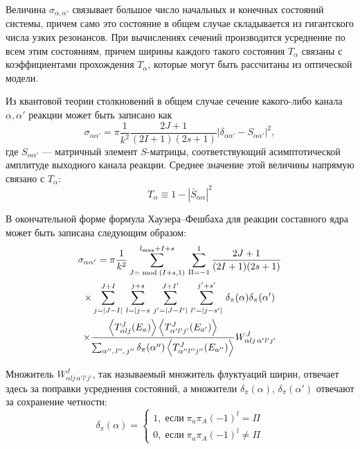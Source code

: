 Величина $\sigma_{\alpha,\alpha'}$ связывает большое число начальных и конечных состояний системы, причем само это состояние в общем случае складывается из гигантского числа узких резонансов. При вычислениях сечений производится усреднение по всем этим состояниям, причем ширины каждого такого состояния $T_\alpha$ связаны с коэффициентами прохождения $T_\alpha$, которые могут быть рассчитаны из оптической модели.

Из квантовой теории столкновений в общем случае сечение какого-либо канала $\alpha, \alpha'$ реакции может быть записано как
\begin{equation}
\displaystyle
\sigma_{\alpha \alpha'} = \pi \frac{1}{k^2} 
\frac{2J + 1}{(2I + 1)(2s + 1)}
|\delta_{\alpha \alpha'} - S_{\alpha \alpha'}|^2,
\end{equation}
где $S_{\alpha \alpha'}$ --- матричный элемент $S$-матрицы, соответствующий асимптотической амплитуде выходного канала реакции. Среднее значение этой величины напрямую связано с $T_\alpha$:
\begin{equation}
\displaystyle
T_\alpha \equiv 1 - |\bar{S}_{\alpha\alpha}|^2
\end{equation}

В окончательной форме формула Хаузера--Фешбаха для реакции составного ядра может быть записана следующим образом:
\begin{equation}
\begin{gathered}
\displaystyle
\sigma_{\alpha \alpha^\prime} = 
\pi \frac{1}{k^2}
\sum_{J=\bmod(I + s, 1)}^{l_\text{max} + I + s} \,
\sum_{\Pi=-1}^1 \frac{2J + 1}{(2I + 1)(2s + 1)} \\ \times
\sum_{j=|J-I|}^{J+I} \,
\sum_{l=|j-s}^{j+s} \,
\sum_{j^\prime=|J-I^\prime|}^{J+I^\prime} \,
\sum_{l^\prime=|j-s^\prime|}^{j^\prime+s^\prime} \,
\delta_\pi(\alpha) \delta_\pi(\alpha^\prime) \\ \times
\frac{
  \expval{T_{\alpha l j}^J(E_a)}
  \expval{T_{\alpha^\prime l^\prime j^\prime}^J(E_{a'})}
}{
  \sum_{\alpha'',\, l'',\, j''} \delta_\pi(\alpha'') 
  \expval{T_{\alpha'' l'' j''}^J(E_{a''})}
}
W^J_{\alpha l j \, \alpha' l' j'}
\end{gathered}
\label{eq:talys_cs}
\end{equation}

Множитель $W^J_{\alpha l j \, \alpha' l' j'}$, так называемый множитель флуктуаций ширин, отвечает здесь за поправки усреднения состояний, а множители $\delta_\pi(\alpha)$, $\delta_\pi(\alpha')$ отвечают за сохранение четности:
\begin{equation}
\delta_\pi(\alpha) = \begin{cases}
1, \;\text{если}\; \pi_a \pi_A (-1)^l = \Pi\\
0, \;\text{если}\; \pi_a \pi_A (-1)^l \neq \Pi
\end{cases}
\end{equation}

